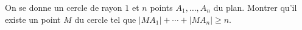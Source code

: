 On se donne un cercle de rayon $1$ et $n$ points $A_1, \ldots, A_n$ du plan. Montrer qu'il existe un point $M$ du cercle tel que $|MA_1| + \cdots + |MA_n| \geq n$.
